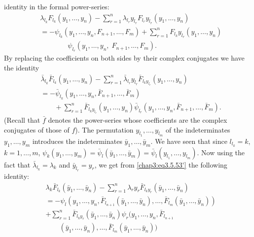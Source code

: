 identity in the formal power-series: 
\begin{align*}
& \lambda_{l_k} F_{l_k} (y_1, \ldots, y_n) - \sum\limits^n_{r=1}
  \lambda_{l_r} y_{l_r} F_{l_r} y_{l_r} (y_1, \ldots, y_n)
  \tag{3.5.53}\label{chap3:eq3.5.53} \\ 
& = - \psi_{l_k}  (y_1, \ldots, y_n, F_{n+1} , \ldots, F_m) +
  \sum\limits^n_{r=1} F_{l_k} y_{l_r} (y_1, \ldots, y_n)\\ 
&\qquad\qquad \psi_{l_r} (y_1, \ldots, y_n,\; F_{n+1}, \ldots, F_m).  
\end{align*}
By replacing the coefficients on both sides by their complex
conjugates we have the identity 
\begin{align*}
& \bar{\lambda}_{l_k} \bar{F}_{l_k} (y_1, \ldots, y_n) -
  \sum\limits^n_{r=1} \bar{\lambda}_{l_r} y_{l_r} \bar{F}_{l_k
    y_{l_r}}  (y_1, \ldots,
  y_n)\tag*{(3.5.53)$'$} \label{chap3:eq3.5.53'}\\ 
& = - \bar{\psi}_{l_k} (y_1, \ldots, y_n, \bar{F}_{n+1}, \ldots,
  \bar{F}_m)\\ 
&\qquad + \sum\limits^n_{r=1} \bar{F}_{l_k y_{l_r}} (y_1, \ldots, y_n)
  \bar{\psi}_{l_r} (y_1, \ldots, y_n, \bar{F}_{n+1}, \ldots,
  \bar{F}_m).  
\end{align*}
(Recall that $\bar{f}$ denotes the power-series whose coefficients are
the complex conjugates of those of $f$). The permutation $y_{l_1},
\ldots, y_{l_m}$ of the indeterminates $y_1,\ldots, y_m$ introduces
the indeterminates $\bar{y}_1,\ldots, \bar{y}_m$. We have seen that
since $l_{l_k} = k$, $k=1,\ldots, m $, $\psi_k(y_1, \ldots, y_m) =
\bar{\psi}_l (\bar{y}_1, \ldots, \bar{y}_m) = \bar{\psi}_l (y_{l_1},
\ldots, y_{l_m})$. Now using the fact that $\bar{\lambda}_{l_k} =
\lambda_k$ and $\bar{y}_{l_r} = y_r$, we get from
\ref{chap3:eq3.5.53'} the following identity: 
\begin{align*}
& \lambda_k \bar{F}_{l_k} (\bar{y}_1, \ldots, \bar{y}_n) -
  \sum\limits^n_{r=1} \lambda_r y_r \bar{F}_{l_k y_r} (\bar{y}_1,
  \ldots, \bar{y}_n)\\ 
& = - \psi_l (y_1, \ldots, y_n, \bar{F}_{l_{n+1}} (\bar{y}_1, \ldots,
  \bar{y}_n), \ldots, \bar{F}_{l_m} (\bar{y}_1, \ldots, \bar{y}_n))\\ 
&  + \sum\limits^n_{r=1} \bar{F}_{l_k y_r} (\bar{y}_1, \ldots,
  \bar{y}_n) \psi_r (y_1, \ldots, y_n,\bar{F}_{l_{n+1}}\\ 
&\qquad(\bar{y}_1,
  \ldots, \bar{y}_n),\ldots, \bar{F}_{l_m} 
(\bar{y}_1, \ldots,\bar{y}_n)) \tag{3.5.54}\label{chap3:eq3.5.54} 
\end{align*}\pageoriginale 
